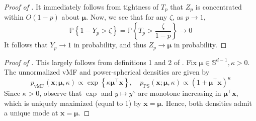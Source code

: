 \begin{proof}[Proof of ]
It immediately follows from tightness of $T_p$ that $Z_p$ is concentrated within $O(1 - p)$ about $\boldsymbol{\mu}$.
Now, we see that for any $\zeta$, as $p \to 1$,
\[
    \mathbb{P}\left\{1 - Y_p > \zeta\right\} = \mathbb{P}\left\{T_p > \frac{\zeta}{1 - p}\right\} \to 0
\]
It follows that $Y_p \to 1$ in probability, and thus $Z_p \to \boldsymbol{\mu}$ in probability.
\end{proof}

\begin{proof}[Proof of ]
This largely follows from definitions 1 and 2 of \cite{decao2020powersphericaldistribution}.
Fix $\boldsymbol{\mu} \in \mathbb{S}^{d - 1}, \kappa > 0$. The unnormalized vMF and power-spherical densities
are given by
\[
    p_{\text{vMF}}(\mathbf{x}; \boldsymbol{\mu}, \kappa) \propto \exp\left\{ \kappa\boldsymbol{\mu}^\top\mathbf{x} \right\}
    , \quad
    p_{\text{PS}}(\mathbf{x}; \boldsymbol{\mu}, \kappa) \propto \left(1 + \boldsymbol{\mu}^\top\mathbf{x}\right)^\kappa
\]
Since $\kappa > 0$, observe that $\exp$ and $y \mapsto y^\kappa$ are monotone increasing in $\boldsymbol{\mu}^\top\mathbf{x}$,
which is uniquely maximized (equal to 1) by $\mathbf{x} = \boldsymbol{\mu}$. Hence, both densities admit a unique mode at
$\mathbf{x} = \boldsymbol{\mu}$.
\end{proof}
